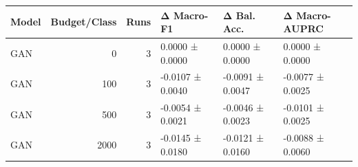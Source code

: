 \begin{tabular}{lrrlll}
\toprule
Model & Budget/Class & Runs & Δ Macro-F1 & Δ Bal. Acc. & Δ Macro-AUPRC \\
\midrule
GAN & 0 & 3 & 0.0000 ± 0.0000 & 0.0000 ± 0.0000 & 0.0000 ± 0.0000 \\
GAN & 100 & 3 & -0.0107 ± 0.0040 & -0.0091 ± 0.0047 & -0.0077 ± 0.0025 \\
GAN & 500 & 3 & -0.0054 ± 0.0021 & -0.0046 ± 0.0023 & -0.0101 ± 0.0025 \\
GAN & 2000 & 3 & -0.0145 ± 0.0180 & -0.0121 ± 0.0160 & -0.0088 ± 0.0060 \\
\bottomrule
\end{tabular}
